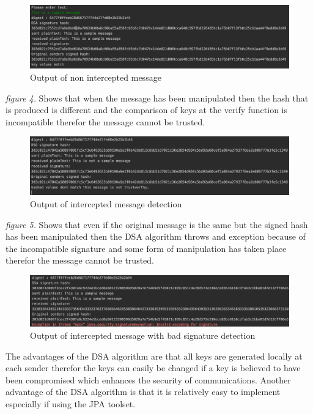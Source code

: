 \documentclass[a4paper, twoside, 11pt]{article}
\begin{document}
\begin{figure}[H]
	\centering
	\includegraphics[scale=0.5]{Images/successDSAMessage.png}
  \caption{Output of non intercepted message}
\end{figure}

\textit{figure 4.} Shows that when the message has been manipulated then the hash that is produced is different and the comparison of keys at the verify function is incompatible therefor the message cannot be trusted. \\

\begin{figure}[H]
	\centering
	\includegraphics[scale=0.5]{Images/interceptedDSAMessage.png}
  \caption{Output of intercepted message detection}
\end{figure}

\textit{figure 5.} Shows that even if the original message is the same but the signed hash has been manipulated then the DSA algorithm throws and exception because of the incompatible signature and some form of manipulation has taken place therefor the message cannot be trusted. \\

\begin{figure}[H]
	\centering
	\includegraphics[scale=0.5]{Images/interceptedKeyMessage.png}
  \caption{Output of intercepted message with bad signature detection}
\end{figure}

The advantages of the DSA algorithm are that all keys are generated locally at each sender therefor the keys can easily be changed if a key is believed to have been compromised which enhances the security of communications. Another advantage of the DSA algorithm is that it is relatively easy to implement especially if using the JPA toolset.
\end{document}
